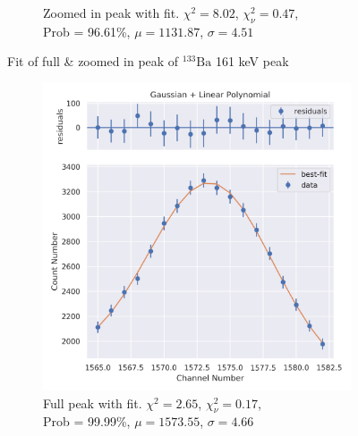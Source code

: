\documentclass[11pt,a4paper]{article}
\newcommand{\element}[2]{$^{#2}\textrm{#1}$}
\begin{document}
\begin{figure}[H]
\begin{subfigure}{.5\linewidth}
    \caption{Zoomed in peak with fit. $\chi^2 = 8.02$, $\chi^2_\nu = 0.47$, \\ Prob = 96.61\%, $\mu = 1131.87$, $\sigma = 4.51$}
  \end{subfigure}
  \caption{Fit of full \& zoomed in peak of \element{Ba}{133} 161 keV peak}
\end{figure}
\begin{figure}[H]
  \centering
  \begin{subfigure}{.5\linewidth}
    \centering
    \includegraphics[width=\linewidth]{./Images/Barium133/Linear/Linear_3_Full.png}
    \caption{Full peak with fit. $\chi^2 = 2.65$, $\chi^2_\nu = 0.17$, \\ Prob = 99.99\%, $\mu = 1573.55$, $\sigma = 4.66$}
  \end{subfigure}%
  \begin{subfigure}{.5\linewidth}
    \centering

\end{subfigure}
\end{figure}
\end{document}
